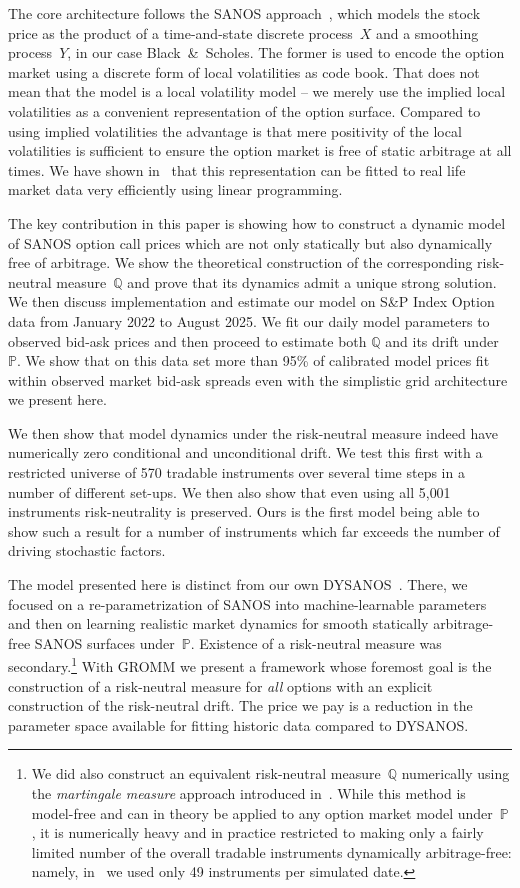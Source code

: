 \documentclass[11pt]{article}
\newcommand{\Q}{\mathbb Q}
\newcommand{\PP}{\mathbb P}
\theoremstyle{plain}
\theoremstyle{definition}
\theoremstyle{remark}
\begin{document}
The core architecture follows the SANOS approach~\citep{SANOS2026}, which models the stock price as the product
of a time-and-state discrete process~$X$ and a smoothing process~$Y$, in our case Black~\&~Scholes.
The former is used to encode the option market using a discrete form of local volatilities as code book. That does not mean
that the model is a local volatility model -- we merely use the implied local volatilities as a convenient representation of the option surface.
Compared to using implied volatilities the advantage is that mere positivity of the local volatilities is sufficient to ensure
the option market is free of static arbitrage at all times. We have shown in~\cite{SANOS2026} that this representation
can be fitted to real life market data very efficiently using linear programming.

The key contribution in this paper is showing how to construct a dynamic model of SANOS option call prices which are not only statically but
also dynamically free of arbitrage. We show the theoretical construction of the corresponding risk-neutral measure~$\mathbb{Q}$
and prove that its dynamics admit a unique strong solution. We then discuss implementation
and estimate our model on S\&P Index Option data from January 2022 to August 2025. We fit our daily model parameters to observed bid-ask prices and then proceed to
estimate both $\Q$ and its drift under $\PP$. We show that
on this data set more than 95\% of calibrated
model prices fit within observed market bid-ask spreads even with the simplistic grid architecture we present here.

We then show that model dynamics under the risk-neutral measure indeed have numerically zero conditional and unconditional drift. We test this first
with a restricted universe of 570 tradable instruments over several time steps in a number of different set-ups. We then also show that even using all 5{,}001 instruments
 risk-neutrality is preserved. Ours is the first model being able to show such a result for a number of instruments which far exceeds
the number of driving stochastic factors.

The model presented here is distinct from our own DYSANOS~\citep{DYSANOS2026}. There, we focused on a re-parametrization of SANOS into machine-learnable parameters
and then on learning
realistic market dynamics for smooth statically arbitrage-free SANOS
surfaces under~$\PP$. Existence of a risk-neutral measure was secondary.\footnote{
We did also construct an equivalent risk-neutral measure~$\Q$ numerically using the \emph{martingale measure} approach introduced in~\cite{removedrift}.
While this method is model-free and can in theory be applied to any option market model under~$\PP$, it is numerically heavy and in practice
restricted to making only a fairly limited number of the overall tradable instruments
dynamically arbitrage-free: namely, in~\cite{DYSANOS2026} we used only 49 instruments per simulated date.}
With GROMM we present a framework whose foremost goal is the construction of a risk-neutral measure for \emph{all} options with
an explicit construction of the risk-neutral drift. The price we pay is a reduction
in the parameter space available for fitting historic data compared to DYSANOS.
\end{document}
